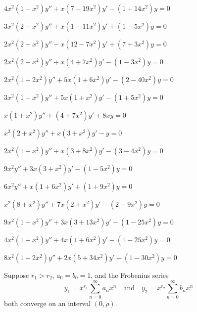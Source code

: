 \begin{exerciselist}
\item\label{exer:7.5.37}$4x^2(1-x^2)y''+x(7-19x^2)y'-(1+14x^2)y=0$

\item\label{exer:7.5.38}$3x^2(2-x^2)y''+x(1-11x^2)y'+(1-5x^2)y=0$

\item\label{exer:7.5.39}$2x^2(2+x^2)y''-x(12-7x^2)y'+(7+3x^2)y=0$

\item\label{exer:7.5.40}$2x^2(2+x^2)y''+x(4+7x^2)y'-(1-3x^2)y=0$

\item\label{exer:7.5.41}$2x^2(1+2x^2)y''+5x(1+6x^2)y'-(2-40x^2)y=0$

\item\label{exer:7.5.42}$3x^2(1+x^2)y''+5x(1+x^2)y'-(1+5x^2)y=0$

\item\label{exer:7.5.43}$x(1+x^2)y''+(4+7x^2)y'+8xy=0$

\item\label{exer:7.5.44}$x^2(2+x^2)y''+x(3+x^2)y'-y=0$

\item\label{exer:7.5.45}$2x^2(1+x^2)y''+x(3+8x^2)y'-(3-4x^2)y=0$

\item\label{exer:7.5.46}$9x^2y''+3x(3+x^2)y'-(1-5x^2)y=0$



\item\label{exer:7.5.47}\Cex
$6x^2y''+x(1+6x^2)y'+(1+9x^2)y=0$

\item\label{exer:7.5.48}\Cex
$x^2(8+x^2)y''+7x(2+x^2)y'-(2-9x^2)y=0$

\item\label{exer:7.5.49}\Cex
$9x^2(1+x^2)y''+3x(3+13x^2)y'-(1-25x^2)y=0$

\item\label{exer:7.5.50}\Cex
$4x^2(1+x^2)y''+4x(1+6x^2)y'-(1-25x^2)y=0$

\item\label{exer:7.5.51}\Cex
$8x^2(1+2x^2)y''+2x(5+34x^2)y'-(1-30x^2)y=0$


\item\label{exer:7.5.52}Suppose $r_1>r_2$, $a_0=b_0=1$, and the
Frobenius series
\[
y_1=x^{r_1}\sum_{n=0}^\infty a_nx^n\quad\text{and}
\quad y_2=x^{r_2}\sum_{n=0}^\infty b_nx^n
\]
both converge on an interval $(0,\rho)$.


\end{exerciselist}
